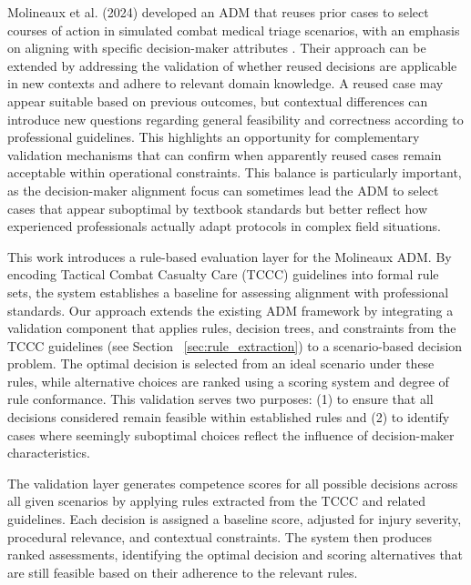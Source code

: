 \documentclass[conference]{IEEEtran}
\begin{document}
Molineaux et al. (2024) developed an ADM that reuses prior cases to select courses of action in simulated combat medical triage scenarios, with an emphasis on aligning with specific decision-maker attributes \cite{molineaux_aligning_2024}. Their approach can be extended by addressing the validation of whether reused decisions are applicable in new contexts and adhere to relevant domain knowledge. A reused case may appear suitable based on previous outcomes, but contextual differences can introduce new questions regarding general feasibility and correctness according to professional guidelines. This highlights an opportunity for complementary validation mechanisms that can confirm when apparently reused cases remain acceptable within operational constraints. This balance is particularly important, as the decision-maker alignment focus can sometimes lead the ADM to select cases that appear suboptimal by textbook standards but better reflect how experienced professionals actually adapt protocols in complex field situations.

This work introduces a rule-based evaluation layer for the Molineaux ADM. By encoding Tactical Combat Casualty Care (TCCC) guidelines into formal rule sets, the system establishes a baseline for assessing alignment with professional standards. Our approach extends the existing ADM framework by integrating a validation component that applies rules, decision trees, and constraints from the TCCC guidelines (see Section ~\ref{sec:rule_extraction}) to a scenario-based decision problem. The optimal decision is selected from an ideal scenario under these rules, while alternative choices are ranked using a scoring system and degree of rule conformance. This validation serves two purposes: (1) to ensure that all decisions considered remain feasible within established rules and (2) to identify cases where seemingly suboptimal choices reflect the influence of decision-maker characteristics.

The validation layer generates competence scores for all possible decisions across all given scenarios by applying rules extracted from the TCCC and related guidelines. Each decision is assigned a baseline score, adjusted for injury severity, procedural relevance, and contextual constraints. The system then produces ranked assessments, identifying the optimal decision and scoring alternatives that are still feasible based on their adherence to the relevant rules.
\end{document}
